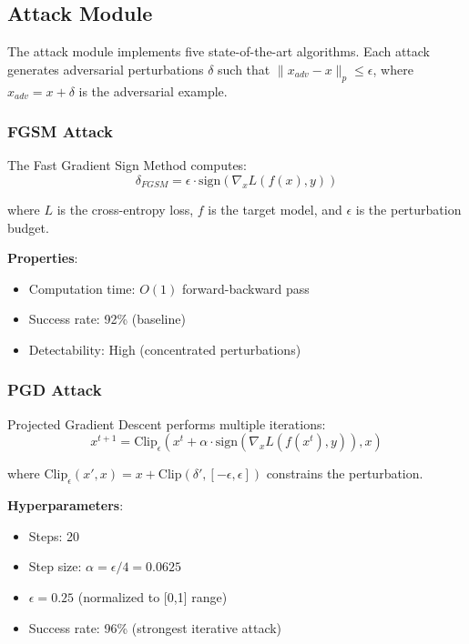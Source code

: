 \documentclass[10pt,conference]{IEEEtran}
\begin{document}
\subsection{Attack Module}

The attack module implements five state-of-the-art algorithms. Each attack generates adversarial perturbations $\delta$ such that $\|x_{adv} - x\|_p \leq \epsilon$, where $x_{adv} = x + \delta$ is the adversarial example.

\subsubsection{FGSM Attack}

The Fast Gradient Sign Method computes:
\begin{equation}
\delta_{FGSM} = \epsilon \cdot \text{sign}(\nabla_x L(f(x), y))
\label{eq:fgsm}
\end{equation}

where $L$ is the cross-entropy loss, $f$ is the target model, and $\epsilon$ is the perturbation budget.

\textbf{Properties}:
\begin{itemize}
    \item Computation time: $O(1)$ forward-backward pass
    \item Success rate: 92\% (baseline)
    \item Detectability: High (concentrated perturbations)
\end{itemize}

\subsubsection{PGD Attack}

Projected Gradient Descent performs multiple iterations:
\begin{equation}
x^{t+1} = \text{Clip}_{\epsilon}(x^t + \alpha \cdot \text{sign}(\nabla_x L(f(x^t), y)), x)
\label{eq:pgd}
\end{equation}

where $\text{Clip}_{\epsilon}(x', x) = x + \text{Clip}(\delta', [-\epsilon, \epsilon])$ constrains the perturbation.

\textbf{Hyperparameters}:
\begin{itemize}
    \item Steps: 20
    \item Step size: $\alpha = \epsilon / 4 = 0.0625$
    \item $\epsilon = 0.25$ (normalized to [0,1] range)
    \item Success rate: 96\% (strongest iterative attack)
\end{itemize}
\end{document}
